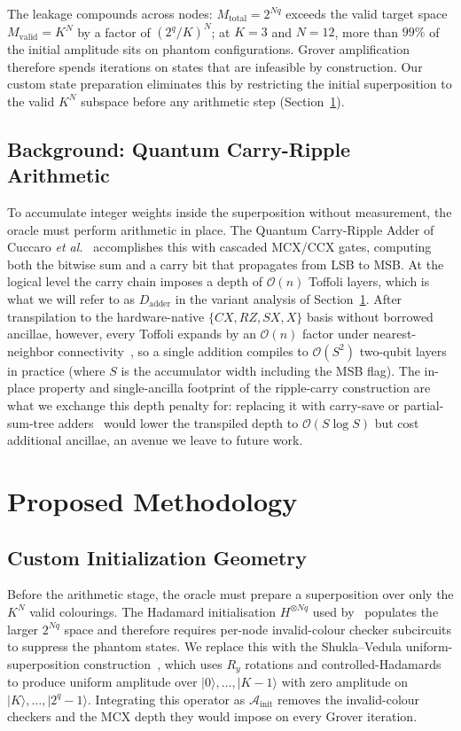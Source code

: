 \documentclass{ieeeaccess}
\begin{document}
The leakage compounds across nodes: $M_{\text{total}} = 2^{Nq}$ exceeds the valid target space $M_{\text{valid}} = K^N$ by a factor of $(2^q/K)^N$; at $K = 3$ and $N = 12$, more than $99\%$ of the initial amplitude sits on phantom configurations. Grover amplification therefore spends iterations on states that are infeasible by construction. Our custom state preparation eliminates this by restricting the initial superposition to the valid $K^N$ subspace before any arithmetic step (Section~\ref{sec:methodology}).

\subsection{Background: Quantum Carry-Ripple Arithmetic}
To accumulate integer weights inside the superposition without measurement, the oracle must perform arithmetic in place. The Quantum Carry-Ripple Adder of Cuccaro \textit{et al.}~\cite{cuccaro2004} accomplishes this with cascaded MCX/CCX gates, computing both the bitwise sum and a carry bit that propagates from LSB to MSB. At the logical level the carry chain imposes a depth of $\mathcal{O}(n)$ Toffoli layers, which is what we will refer to as $D_{\mathrm{adder}}$ in the variant analysis of Section~\ref{sec:methodology}. After transpilation to the hardware-native $\{CX, RZ, SX, X\}$ basis without borrowed ancillae, however, every Toffoli expands by an $\mathcal{O}(n)$ factor under nearest-neighbor connectivity~\cite{barenco1995,nielsen2010}, so a single addition compiles to $\mathcal{O}(S^2)$ two-qubit layers in practice (where $S$ is the accumulator width including the MSB flag). The in-place property and single-ancilla footprint of the ripple-carry construction are what we exchange this depth penalty for: replacing it with carry-save or partial-sum-tree adders~\cite{thapliyal2010} would lower the transpiled depth to $\mathcal{O}(S \log S)$ but cost additional ancillae, an avenue we leave to future work.

\section{Proposed Methodology}
\label{sec:methodology}

\subsection{Custom Initialization Geometry}
Before the arithmetic stage, the oracle must prepare a superposition over only the $K^N$ valid colourings. The Hadamard initialisation $H^{\otimes Nq}$ used by~\cite{belletti2025} populates the larger $2^{Nq}$ space and therefore requires per-node invalid-colour checker subcircuits to suppress the phantom states. We replace this with the Shukla--Vedula uniform-superposition construction~\cite{shukla2024}, which uses $R_y$ rotations and controlled-Hadamards to produce uniform amplitude over $|0\rangle, \dots, |K-1\rangle$ with zero amplitude on $|K\rangle, \dots, |2^q-1\rangle$. Integrating this operator as $\mathcal{A}_\mathrm{init}$ removes the invalid-colour checkers and the MCX depth they would impose on every Grover iteration.
\end{document}

